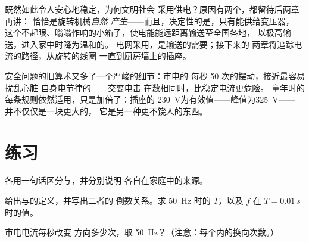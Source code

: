 \begin{remark}[为什么世界选择了摆动的电流]\label{rem:g9:alternating-current:why}
既然如此令人安心地稳定，为何文明社会
采用供电？原因有两个，都留待后两章再讲：
恰恰是旋转机械\emph{自然
产生}——而且，决定性的是，只有能供给变压器，
这个不起眼、嗡嗡作响的小箱子，使电能能远距离输送至全国各地，
以极高输送，进入家中时降为温和的。
电网采用，是输送的需要；接下来的
两章将追踪电流的路径，从旋转的线圈
一直到厨房墙上的插座。
\end{remark}

\begin{remark}[摆动的电流与人体]\label{rem:g9:alternating-current:safety}
安全问题的旧算术又多了一个严峻的细节：市电的
每秒 50 次的摆动，接近最容易扰乱心脏
自身电节律的——交变电击
在数相同时，比稳定电流更危险。
童年时的每条规则依然适用，只是加倍了：插座的
\qty{230}{V}为有效值——峰值为\qty{325}{V}——
并不仅仅是一块更大的，
它是另一种更不饶人的东西。
\end{remark}

\section{练习}

\begin{exercise}[$\star$]\label{exo:g9:alternating-current:1}
各用一句话区分与，并分别说明
各自在家庭中的来源。
\end{exercise}

\begin{exercise}[$\star$]\label{exo:g9:alternating-current:2}
给出与的定义，并写出二者的
倒数关系。求 \qty{50}{Hz} 时的 $T$，以及 $f$ 在
$T = \qty{0.01}{s}$ 时的值。
\end{exercise}

\begin{exercise}[$\star$]\label{exo:g9:alternating-current:3}
市电电流每秒改变
方向多少次，取 \qty{50}{Hz}？（注意：每个内的换向次数。）
\end{exercise}

